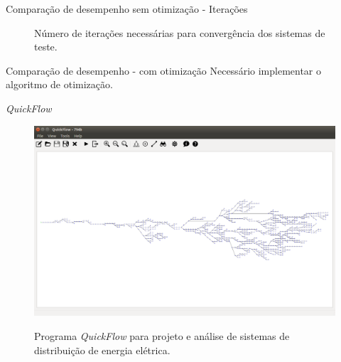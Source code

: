 \documentclass[10pt]{beamer}
\begin{document}
\begin{frame}{Comparação de desempenho sem otimização - Iterações}
    \begin{figure}
        \centering
        \caption{Número de iterações necessárias para convergência dos sistemas de teste.}
    \end{figure}
\end{frame}

\begin{frame}{Comparação de desempenho - com otimização}
    Necessário implementar o algoritmo de otimização.
\end{frame}

\begin{frame}{\textit{QuickFlow}}
    \begin{figure}[H]
        \centering
        \caption{Programa \textit{QuickFlow} para projeto e análise de sistemas de distribuição de energia elétrica.}
        \includegraphics[scale=0.22]{img/quickflow}
        \label{fig:quickflow}
    \end{figure}
\end{frame}
\end{document}
